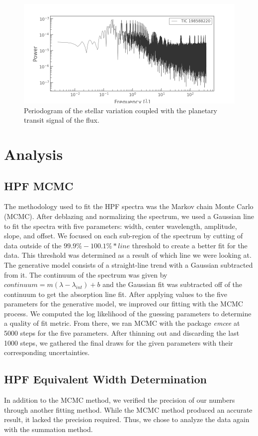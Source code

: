 \documentclass[modern]{aastex631}
\begin{document}
\begin{figure}
    \includegraphics[width=\linewidth]{figures/planetary_periodogram.png}
    \caption{Periodogram of the stellar variation coupled with the planetary transit signal of the flux. }
    \label{fig:planetary_periodogram}
\end{figure}

\section{Analysis}
\subsection{HPF MCMC}
The methodology used to fit the HPF spectra was the Markov chain Monte Carlo (MCMC). After deblazing and normalizing the spectrum, we used a Gaussian line to fit the spectra with five parameters: width, center wavelength, amplitude, slope, and offset.  We focused on each sub-region of the spectrum by cutting of data outside of the $99.9\%-100.1\%*line$ threshold to create a better fit for the data. This threshold was determined as a result of which line we were looking at. The generative model consists of a straight-line trend with a Gaussian subtracted from it. The continuum of the spectrum was given by $continuum=m(\lambda-\lambda_{int})+b$ and the Gaussian fit was subtracted off of the continuum to get the absorption line fit. After applying values to the five parameters for the generative model, we improved our fitting with the MCMC process. We computed the log likelihood of the guessing parameters to determine a quality of fit metric. From there, we ran MCMC with the package \textit{emcee} at 5000 steps for the five parameters. After thinning out and discarding the last 1000 steps, we gathered the final draws for the given parameters with their corresponding uncertainties.

\subsection{HPF Equivalent Width Determination}
In addition to the MCMC method, we verified the precision of our numbers through another fitting method. While the MCMC method produced an accurate result, it lacked the precision required. Thus, we chose to analyze the data again with the summation method.
\end{document}
